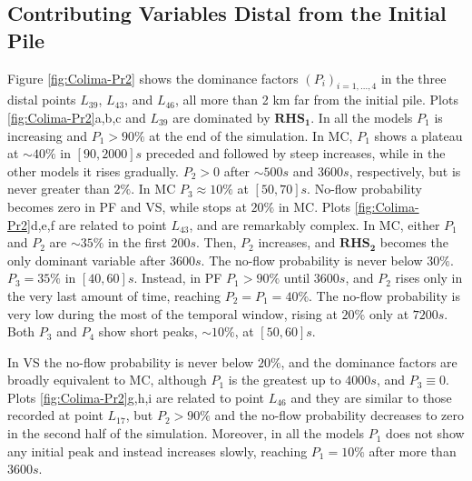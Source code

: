 \documentclass{article}
\begin{document}
\subsection{Contributing Variables Distal from the Initial Pile}
Figure \ref{fig:Colima-Pr2} shows the dominance factors $(P_i)_{i=1,\dots,4}$ in the three distal points $L_{39}$, $L_{43}$, and $L_{46}$, all more than 2 km far from the initial pile. Plots \ref{fig:Colima-Pr2}a,b,c and $L_{39}$ are dominated by $\boldsymbol{RHS_1}$. In all the models $P_1$ is increasing and $P_1>90\%$ at the end of the simulation. In MC, $P_1$ shows a plateau at $\sim 40\%$ in $[90,2000] s$ preceded and followed by steep increases, while in the other models it rises gradually. $P_2>0$ after $\sim 500 s$ and $3600 s$, respectively, but is never greater than $2\%$. In MC $P_3 \approx 10\%$ at $[50,70] s$. No-flow probability becomes zero in PF and VS, while stops at $20\%$ in MC. Plots \ref{fig:Colima-Pr2}d,e,f are related to point $L_{43}$, and are remarkably complex. In MC, either $P_1$ and $P_2$ are $\sim 35\%$ in the first $200 s$. Then, $P_2$ increases, and $\boldsymbol{RHS_2}$ becomes the only dominant variable after $3600 s$. The no-flow probability is never below $30\%$. $P_3=35\%$ in $[40, 60] s$. Instead, in PF $P_1>90\%$ until $3600 s$, and $P_2$ rises only in the very last amount of time, reaching $P_2=P_1=40\%$. The no-flow probability is very low during the most of the temporal window, rising at $20\%$ only at $7200 s$. Both $P_3$ and $P_4$ show short peaks, $\sim 10\%$, at $[50,60] s$.

In VS the no-flow probability is never below $20\%$, and the dominance factors are broadly equivalent to MC, although $P_1$ is the greatest up to $4000 s$, and $P_3\equiv0$. Plots \ref{fig:Colima-Pr2}g,h,i are related to point $L_{46}$ and they are similar to those recorded at point $L_{17}$, but $P_2>90\%$ and the no-flow probability decreases to zero in the second half of the simulation. Moreover, in all the models $P_1$ does not show any initial peak and instead increases slowly, reaching $P_1=10\%$ after more than $3600 s$.
\end{document}
